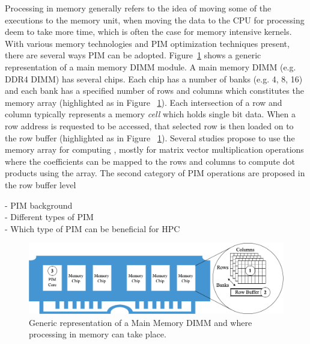 Processing in memory generally refers to the idea of moving some of the executions to the memory unit, when moving the data to the CPU for processing deem to take more time, which is often the case for memory intensive kernels. With various memory technologies and PIM optimization techniques present, there are several ways PIM can be adopted. Figure~\ref{fig:pimcat} shows a generic representation of a main memory DIMM module. A main memory DIMM (e.g. DDR4 DIMM) has several chips. Each chip has a number of banks (e.g. 4, 8, 16) and each bank has a specified number of rows and columns which constitutes the memory array (highlighted as  in Figure ~\ref{fig:pimcat}). Each intersection of a row and column typically represents a memory \textit{cell} which holds single bit data. When a row address is requested to be accessed, that selected row is then loaded on to the row buffer (highlighted as  in Figure ~\ref{fig:pimcat}). Several studies propose to use the memory array  for computing \cite{03,06,13,15,20,29,54,55,58}, mostly for matrix vector multiplication operations where the coefficients can be mapped to the rows and columns to compute dot products using the array. The second category of PIM operations are proposed in the row buffer level  \cite{10,40}       







-	PIM background \\
-	Different types of PIM \\
-	Which type of PIM can be beneficial for HPC \\


\begin{figure}[t!]
\centering
\includegraphics[width=\columnwidth]{MEMSYS22/figures/pimcat.png}
\caption{Generic representation of a Main Memory DIMM and where processing in memory can take place.}
\label{fig:pimcat}
\end{figure}   


  